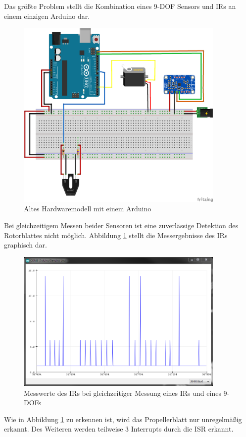 Das größte Problem stellt die Kombination eines \ac{9-DOF} Sensors und \ac{IR}s an einem einzigen Arduino dar.
\begin{figure}[H]
	\centering
	\includegraphics[width=0.9\textwidth]{images/chapter/03/hardware-layout-with-one-arduino.png}
	\caption{Altes Hardwaremodell mit einem Arduino}
\end{figure}
Bei gleichzeitigem Messen beider Sensoren ist eine zuverlässige Detektion des Rotorblattes nicht möglich.
Abbildung \ref{fig:interrupts_are_shit} stellt die Messergebnisse des \ac{IR}s graphisch dar.
\begin{figure}[H]
	\centering
	\includegraphics[width=0.9\textwidth]{images/chapter/03/interrupts_are_shit.png}
	\caption{Messwerte des \ac{IR}s bei gleichzeitiger Messung eines \ac{IR}s und eines \ac{9-DOF}s}
	\label{fig:interrupts_are_shit}
\end{figure}
Wie in Abbildung \ref{fig:interrupts_are_shit} zu erkennen ist, wird das Propellerblatt nur unregelmäßig erkannt.
Des Weiteren werden teilweise 3 Interrupts durch die \ac{ISR} erkannt.

